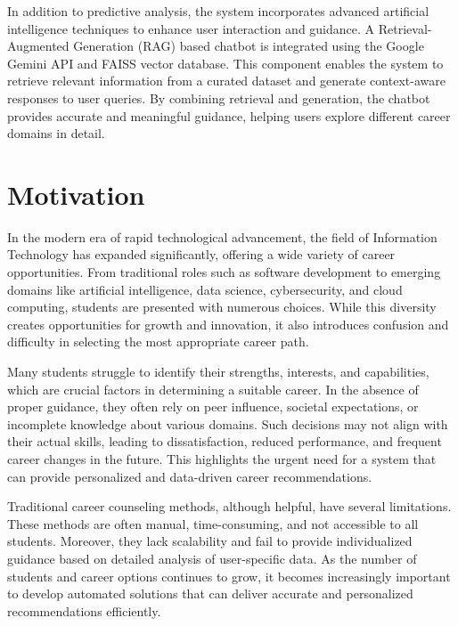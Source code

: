 \documentclass[12pt,a4paper]{report}
\begin{document}
{In addition to predictive analysis, the system incorporates advanced artificial intelligence techniques to enhance user interaction and guidance. A Retrieval-Augmented Generation (RAG) based chatbot is integrated using the Google Gemini API and FAISS vector database. This component enables the system to retrieve relevant information from a curated dataset and generate context-aware responses to user queries. By combining retrieval and generation, the chatbot provides accurate and meaningful guidance, helping users explore different career domains in detail.




\chapter{Motivation}
\setlength{\parindent}{0pt}
\setlength{\parskip}{0.5em}
\justifying

In the modern era of rapid technological advancement, the field of Information Technology has expanded significantly, offering a wide variety of career opportunities. From traditional roles such as software development to emerging domains like artificial intelligence, data science, cybersecurity, and cloud computing, students are presented with numerous choices. While this diversity creates opportunities for growth and innovation, it also introduces confusion and difficulty in selecting the most appropriate career path.

Many students struggle to identify their strengths, interests, and capabilities, which are crucial factors in determining a suitable career. In the absence of proper guidance, they often rely on peer influence, societal expectations, or incomplete knowledge about various domains. Such decisions may not align with their actual skills, leading to dissatisfaction, reduced performance, and frequent career changes in the future. This highlights the urgent need for a system that can provide personalized and data-driven career recommendations.

Traditional career counseling methods, although helpful, have several limitations. These methods are often manual, time-consuming, and not accessible to all students. Moreover, they lack scalability and fail to provide individualized guidance based on detailed analysis of user-specific data. As the number of students and career options continues to grow, it becomes increasingly important to develop automated solutions that can deliver accurate and personalized recommendations efficiently.

}
\end{document}
